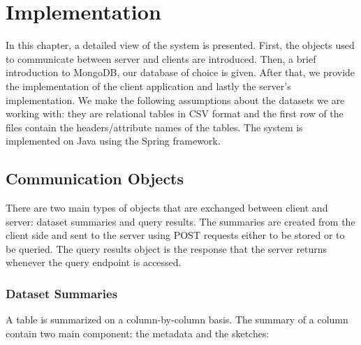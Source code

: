 


\chapter{Implementation}
\label{chap:implementation}
\pagestyle{plain}

In this chapter, a detailed view of the system is presented. First, the objects used to communicate between server and clients are introduced. Then, a brief introduction to MongoDB, our database of choice is given. After that, we provide the implementation of the client application and lastly the server's implementation. We make the following assumptions about the datasets we are working with: they are relational tables in CSV format and the first row of the files contain the headers/attribute names of the tables. The system is implemented on Java using the Spring framework.

\section{Communication Objects}

There are two main types of objects that are exchanged between client and server: dataset summaries and query results. The summaries are created from the client side and sent to the server using POST requests either to be stored or to be queried. The query results object is the response that the server returns whenever the query endpoint is accessed.

\subsection{Dataset Summaries}\label{metadata}

A table is summarized on a column-by-column basis. The summary of a column contain two main component: the metadata and the sketches:

